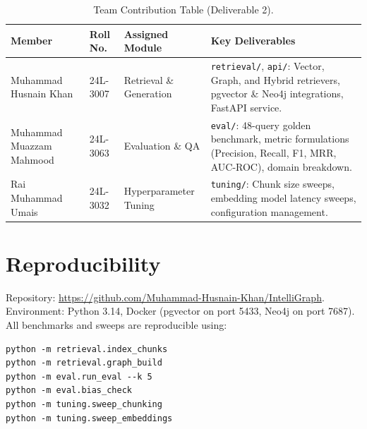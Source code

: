 \documentclass[11pt,a4paper]{article}
\begin{document}
\begin{table}[H]
\centering
\caption{Team Contribution Table (Deliverable 2).}
\small
\renewcommand{\arraystretch}{1.25}
\begin{tabularx}{\textwidth}{@{}L{3.1cm} L{1.9cm} L{3.0cm} Y@{}}
\toprule
\textbf{Member} & \textbf{Roll No.} & \textbf{Assigned Module} & \textbf{Key Deliverables} \\
\midrule
Muhammad Husnain Khan & 24L-3007 & Retrieval \& Generation & \texttt{retrieval/}, \texttt{api/}: Vector, Graph, and Hybrid retrievers, pgvector \& Neo4j integrations, FastAPI service. \\
\addlinespace
Muhammad Muazzam Mahmood & 24L-3063 & Evaluation \& QA & \texttt{eval/}: 48-query golden benchmark, metric formulations (Precision, Recall, F1, MRR, AUC-ROC), domain breakdown. \\
\addlinespace
Rai Muhammad Umais & 24L-3032 & Hyperparameter Tuning & \texttt{tuning/}: Chunk size sweeps, embedding model latency sweeps, configuration management. \\
\bottomrule
\end{tabularx}
\end{table}

\section*{Reproducibility}
Repository: \url{https://github.com/Muhammad-Husnain-Khan/IntelliGraph}. Environment: Python 3.14, Docker (pgvector on port 5433, Neo4j on port 7687). All benchmarks and sweeps are reproducible using:
\begin{verbatim}
python -m retrieval.index_chunks
python -m retrieval.graph_build
python -m eval.run_eval --k 5
python -m eval.bias_check
python -m tuning.sweep_chunking
python -m tuning.sweep_embeddings
\end{verbatim}
\end{document}
